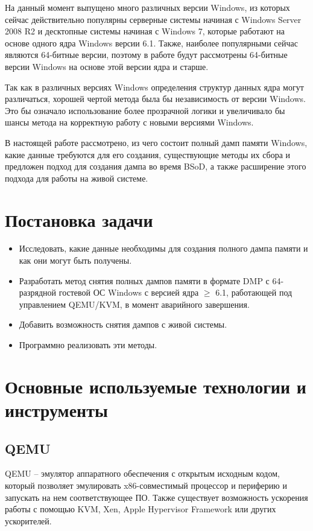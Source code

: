 \documentclass{mipt-thesis-bs}
\begin{document}
На данный момент выпущено много различных версии Windows, из которых сейчас действительно популярны серверные системы начиная с Windows Server 2008 R2 и десктопные системы начиная с Windows 7, которые работают на основе одного ядра Windows версии 6.1. Также, наиболее популярными сейчас являются 64-битные версии, поэтому в работе будут рассмотрены 64-битные версии Windows на основе этой версии ядра и старше.

Так как в различных версиях Windows определения структур данных ядра могут различаться, хорошей чертой метода была бы независимость от версии Windows. Это бы означало использование более прозрачной логики и увеличивало бы шансы метода на корректную работу с новыми версиями Windows.

В настоящей работе рассмотрено, из чего состоит полный дамп памяти Windows, какие данные требуются для его создания, существующие методы их сбора и предложен подход для создания дампа во время BSoD, а также расширение этого подхода для работы на живой системе.

\chapter{Постановка задачи}

\begin{itemize}
\item Исследовать, какие данные необходимы для создания полного дампа памяти и как они могут быть получены.
\item Разработать метод снятия полных дампов памяти в формате DMP с 64-разрядной гостевой ОС Windows с версией ядра $\geqslant$ 6.1, работающей под управлением QEMU/KVM, в момент аварийного завершения.
\item Добавить возможность снятия дампов с живой системы.
\item Программно реализовать эти методы.
\end{itemize}

\chapter{Основные используемые технологии и инструменты}

\section*{QEMU}

QEMU -- эмулятор аппаратного обеспечения с открытым исходным кодом, который позволяет эмулировать x86-совместимый процессор и периферию и запускать на нем соответствующее ПО. Также существует возможность ускорения работы с помощью KVM, Xen, Apple Hypervisor Framework или других ускорителей.
\end{document}
